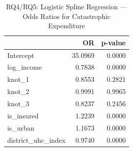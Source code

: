 \begin{table}
\caption{RQ4/RQ5: Logistic Spline Regression — Odds Ratios for Catastrophic Expenditure}
\label{tab:rq4_spline}
\begin{tabular}{lrr}
\toprule
 & OR & p-value \\
\midrule
Intercept & 35.0969 & 0.0000 \\
log_income & 0.7838 & 0.0000 \\
knot_1 & 0.8553 & 0.2821 \\
knot_2 & 0.9991 & 0.9965 \\
knot_3 & 0.8237 & 0.2456 \\
is_insured & 1.2239 & 0.0000 \\
is_urban & 1.1673 & 0.0000 \\
district_uhc_index & 0.9740 & 0.0000 \\
\bottomrule
\end{tabular}
\end{table}
